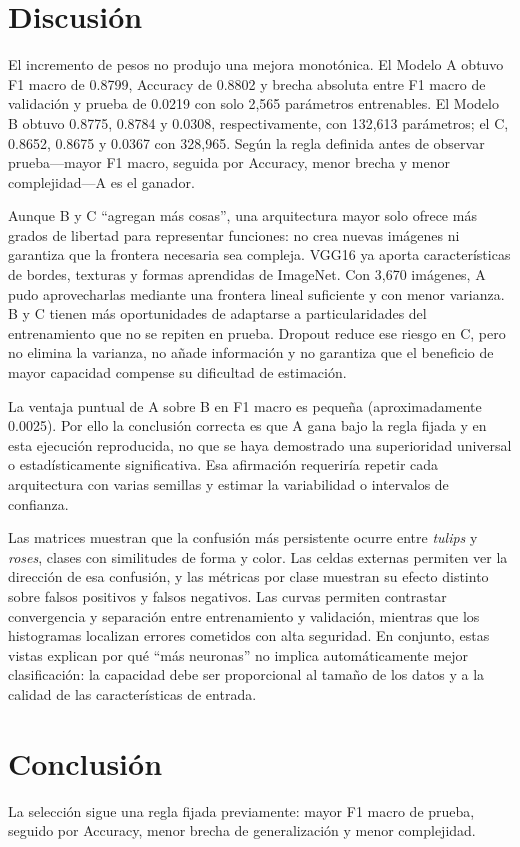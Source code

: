 \documentclass[11pt,letterpaper]{article}
\begin{document}
\section{Discusión}
El incremento de pesos no produjo una mejora monotónica. El Modelo A obtuvo F1
macro de 0.8799, Accuracy de 0.8802 y brecha absoluta entre F1 macro de
validación y prueba de 0.0219 con solo 2,565 parámetros entrenables. El Modelo B
obtuvo 0.8775, 0.8784 y 0.0308, respectivamente, con 132,613 parámetros; el C,
0.8652, 0.8675 y 0.0367 con 328,965. Según la regla definida antes de observar
prueba---mayor F1 macro, seguida por Accuracy, menor brecha y menor
complejidad---A es el ganador.

Aunque B y C ``agregan más cosas'', una arquitectura mayor solo ofrece más
grados de libertad para representar funciones: no crea nuevas imágenes ni
garantiza que la frontera necesaria sea compleja. VGG16 ya aporta
características de bordes, texturas y formas aprendidas de ImageNet. Con 3,670
imágenes, A pudo aprovecharlas mediante una frontera lineal suficiente y con
menor varianza. B y C tienen más oportunidades de adaptarse a particularidades
del entrenamiento que no se repiten en prueba. Dropout reduce ese riesgo en C,
pero no elimina la varianza, no añade información y no garantiza que el
beneficio de mayor capacidad compense su dificultad de estimación.

La ventaja puntual de A sobre B en F1 macro es pequeña (aproximadamente
0.0025). Por ello la conclusión correcta es que A gana bajo la regla fijada y
en esta ejecución reproducida, no que se haya demostrado una superioridad
universal o estadísticamente significativa. Esa afirmación requeriría repetir
cada arquitectura con varias semillas y estimar la variabilidad o intervalos
de confianza.

Las matrices muestran que la confusión más persistente ocurre entre
\emph{tulips} y \emph{roses}, clases con similitudes de forma y color. Las
celdas externas permiten ver la dirección de esa confusión, y las métricas por
clase muestran su efecto distinto sobre falsos positivos y falsos negativos.
Las curvas permiten contrastar convergencia y separación entre entrenamiento y
validación, mientras que los histogramas localizan errores cometidos con alta
seguridad. En conjunto, estas vistas explican por qué ``más neuronas'' no
implica automáticamente mejor clasificación: la capacidad debe ser
proporcional al tamaño de los datos y a la calidad de las características de
entrada.

\section{Conclusión}
La selección sigue una regla fijada previamente: mayor F1 macro de prueba,
seguido por Accuracy, menor brecha de generalización y menor complejidad.
\end{document}
